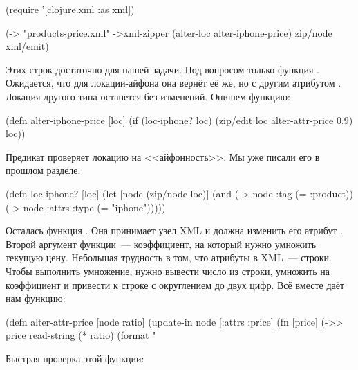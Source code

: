 \begin{english}
  \begin{clojure}
(require '[clojure.xml :as xml])

(-> "products-price.xml"
    ->xml-zipper
    (alter-loc alter-iphone-price)
    zip/node
    xml/emit)
  \end{clojure}
\end{english}

Этих строк достаточно для нашей задачи. Под вопросом только функция
. Ожидается, что для локации-айфона она вернёт её же, но с
другим атрибутом . Локация другого типа останется без изменений. Опишем
функцию:

\begin{english}
  \begin{clojure}
(defn alter-iphone-price
  [loc]
  (if (loc-iphone? loc)
    (zip/edit loc alter-attr-price 0.9)
    loc))
  \end{clojure}
\end{english}

Предикат  проверяет локацию на <<айфонность>>. Мы уже писали его в
прошлом разделе:

\begin{english}
  \begin{clojure}
(defn loc-iphone? [loc]
  (let [node (zip/node loc)]
    (and (-> node :tag (= :product))
         (-> node :attrs :type (= "iphone")))))
  \end{clojure}
\end{english}

Осталась функция . Она принимает узел XML и должна
изменить его атрибут . Второй аргумент функции~--- коэффициент, на
который нужно умножить текущую цену. Небольшая трудность в том, что атрибуты в
XML~--- строки. Чтобы выполнить умножение, нужно вывести число из строки,
умножить на коэффициент и привести к строке с округлением до двух цифр. Всё
вместе даёт нам функцию:

\begin{english}
  \begin{clojure}
(defn alter-attr-price [node ratio]
  (update-in node [:attrs :price]
             (fn [price]
               (->> price
                    read-string
                    (* ratio)
                    (format "%
  \end{clojure}
\end{english}

Быстрая проверка этой функции:

